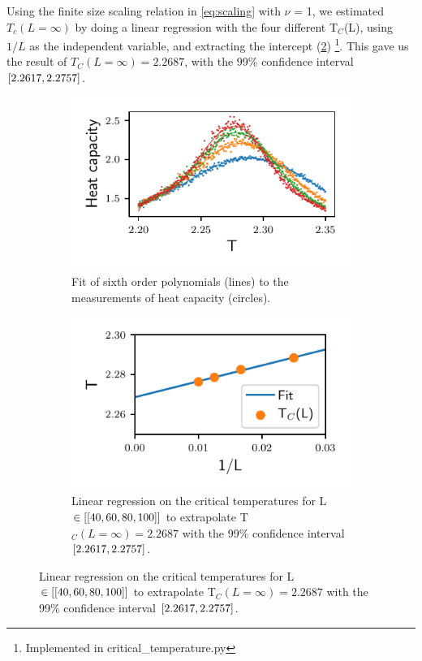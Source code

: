 Using the finite size scaling relation in
\cref{eq:scaling} with $\nu$ = 1, we estimated $T_c(L=\infty)$
by doing a linear
regression with the four different T$_C$(L), using $1/L$ as the independent
variable, and extracting the intercept (\cref{fig:lin_reg})
\footnote{Implemented in critical\_temperature.py}.  This gave us the result of
$T_C(L=\infty)=2.2687$, with the 99\% confidence interval $\left[2.2617, 2.2757\right]$.




 \begin{figure}[h]
   \begin{subfigure}[t]{.5\textwidth} %
     \centering
     \includegraphics[width=\linewidth]{../figures/fit.pdf}
     \caption{Fit of sixth order polynomials (lines) to the measurements
     of heat capacity (circles).}
     \label{fig:polyfit}
   \end{subfigure}
   \hfill
   \begin{subfigure}[t]{.5\textwidth}
     \centering
     \includegraphics[width=\linewidth]{../figures/Tc_fit.pdf}
     \caption{Linear regression on the critical temperatures for L $\in \left[[40,60,80,100]\right]$
     to extrapolate T$_C(L=\infty) = 2.2687$ with the 99\% confidence
     interval $\left[2.2617, 2.2757\right]$.
     }
     \label{fig:lin_reg}
   \end{subfigure}
   \label{fig:test}
 \end{figure}




 \begin{table}[h]
   \centering
   \caption{Results for T$_C(L=\infty)$.}
   \label{tab:critical}
 \end{table}
